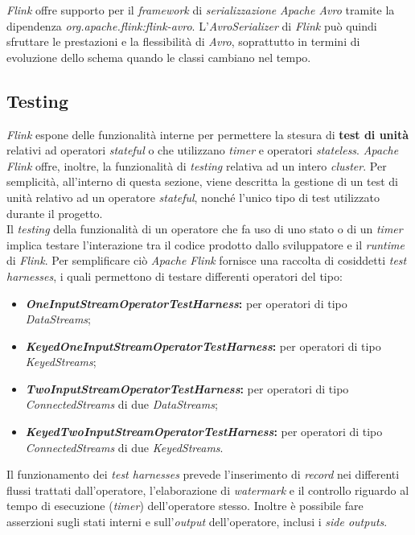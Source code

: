 \label{sec:avro}
\noindent \textit{Flink} offre supporto per il \textit{\textit{\gls{framework}}} di \textit{\gls{serializzazione}} \textit{Apache Avro} tramite la dipendenza \textit{org.apache.flink:flink-avro}. L'\textit{AvroSerializer} di \textit{Flink} può quindi sfruttare le prestazioni e la flessibilità di \textit{Avro}, soprattutto in termini di evoluzione dello schema quando le classi cambiano nel tempo.

\subsection{Testing}\label{sec:flink-testing}
\textit{Flink} espone delle funzionalità interne per permettere la stesura di \textbf{test di unità} relativi ad operatori \textit{\gls{stateful}} o che utilizzano \textit{timer} e operatori \textit{\gls{stateless}}. \textit{Apache Flink} offre, inoltre, la funzionalità di \textit{testing} relativa ad un intero \textit{\gls{cluster}}. Per semplicità, all'interno di questa sezione, viene descritta la gestione di un test di unità relativo ad un operatore \textit{\gls{stateful}}, nonché l'unico tipo di test utilizzato durante il progetto.\\
Il \textit{testing} della funzionalità di un operatore che fa uso di uno stato o di un \textit{timer} implica testare l'interazione tra il codice prodotto dallo sviluppatore e il \textit{runtime} di \textit{Flink}. Per semplificare ciò \textit{Apache Flink} fornisce una raccolta di cosiddetti \textit{test harnesses}, i quali permettono di testare differenti operatori del tipo:
\begin{itemize}
	\item{\textbf{\textit{OneInputStreamOperatorTestHarness}:} per operatori di tipo \textit{DataStreams};}
	\item{\textbf{\textit{KeyedOneInputStreamOperatorTestHarness}:} per operatori di tipo \textit{KeyedStreams};}
	\item{\textbf{\textit{TwoInputStreamOperatorTestHarness}:} per operatori di tipo \textit{ConnectedStreams} di due \textit{DataStreams};}
	\item{\textbf{\textit{KeyedTwoInputStreamOperatorTestHarness}:} per operatori di tipo \textit{ConnectedStreams} di due \textit{KeyedStreams}.}
\end{itemize}

Il funzionamento dei \textit{test harnesses} prevede l'inserimento di \textit{record} nei differenti flussi trattati dall'operatore, l'elaborazione di \textit{watermark} e il controllo riguardo al tempo di esecuzione (\textit{timer}) dell'operatore stesso. Inoltre è possibile fare asserzioni sugli stati interni e sull'\textit{output} dell'operatore, inclusi i \textit{side outputs}. 



